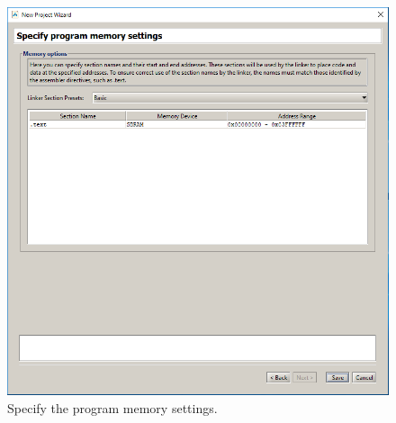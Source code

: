 \documentclass[epsfig,10pt,fullpage]{article}
\begin{document}
\begin{enumerate}
\begin{figure}[H]
	\begin{center}
	\includegraphics[scale=0.58]{figures/figureMP7.png}
	\end{center}
	\caption{Specify the program memory settings.}
\label{fig:MP7}
\end{figure}


\end{enumerate}
\end{document}
